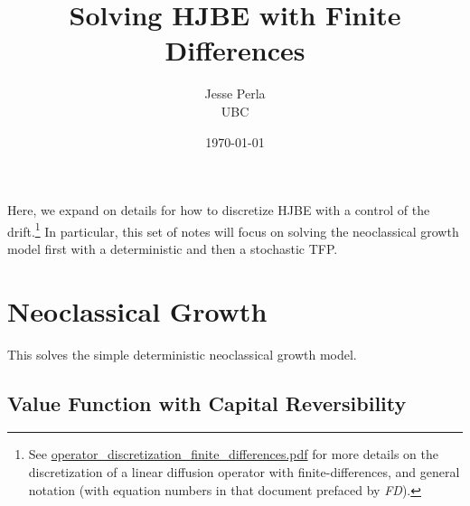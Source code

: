 \documentclass[11pt]{etk-article}
\begin{document}
\title{Solving HJBE with Finite Differences}
\author{Jesse Perla\\UBC}
\date{\today}
\maketitle
 Here, we expand on details for how to discretize HJBE with a control of the drift.\footnote{See \url{operator_discretization_finite_differences.pdf} for more details on the discretization of a linear diffusion operator with finite-differences, and general notation (with equation numbers in that document prefaced by \textit{FD}).}  In particular, this set of notes will focus on solving the neoclassical growth model first with a deterministic and then a stochastic TFP.
 
 \section{Neoclassical Growth}
 This solves the simple deterministic neoclassical growth model.
 \subsection{Value Function with Capital Reversibility}
 
\end{document}
